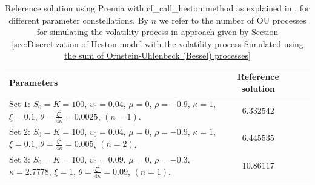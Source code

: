\FloatBarrier
\begin{table}[!h]
	\centering
	\begin{small}
	\begin{tabular}{l*{2}{c}r}
	\toprule[1.5pt]
		Parameters            & Reference solution    \\
		\hline

			Set $1$:	 $S_0=K=100$, $v_0=0.04$, $\mu=0$,  $\rho=-0.9$, $\kappa=1$, $\xi=0.1$, $\theta=\frac{\xi^2}{4 \kappa}=0.0025$, $(n=1)$.  & $6.332542$  \\	
				Set $2$: $S_0=K=100$, $v_0=0.04$, $\mu=0$,  $\rho=-0.9$, $\kappa=1$, $\xi=0.1$, $\theta=\frac{\xi^2}{4 \kappa}=0.005$, $(n=2)$.  & $6.445535$  \\	
					Set $3$:	$S_0=K=100$, $v_0=0.09$, $\mu=0$,  $\rho=-0.3$, $\kappa=2.7778$, $\xi=1$, $\theta=\frac{\xi^2}{4 \kappa}=0.09$, $(n=1)$.  & $10.86117$   \\
	\bottomrule[1.25pt]
	\end{tabular}
\end{small}
	\caption{Reference solution using Premia with cf\_call\_heston method as explained in \cite{heston1993closed}, for different parameter constellations. By $n$ we refer to the number of OU processes for simulating the volatility process in approach given by Section \ref{sec:Discretization of Heston model with the volatility process Simulated using the sum of  Ornstein-Uhlenbeck (Bessel) processes}}
	\label{table:Reference solution, for different parameter constellations.}
\end{table}
\FloatBarrier

